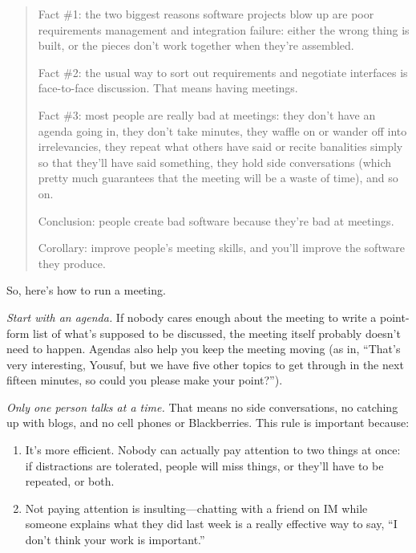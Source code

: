 \documentclass{report}
\begin{document}
\begin{quotation}

  Fact \#1: the two biggest reasons software projects blow up are poor
  requirements management and integration failure: either the wrong
  thing is built, or the pieces don't work together when they're
  assembled.

  Fact \#2: the usual way to sort out requirements and negotiate
  interfaces is face-to-face discussion.  That means having meetings.

  Fact \#3: most people are really bad at meetings: they don't have an
  agenda going in, they don't take minutes, they waffle on or wander
  off into irrelevancies, they repeat what others have said or recite
  banalities simply so that they'll have said something, they hold
  side conversations (which pretty much guarantees that the meeting
  will be a waste of time), and so on.

  Conclusion: people create bad software because they're bad at
  meetings.

  Corollary: improve people's meeting skills, and you'll improve the
  software they produce.

\end{quotation}

So, here's how to run a meeting.
  
\emph{Start with an agenda.} If nobody cares enough about the meeting
to write a point-form list of what's supposed to be discussed, the
meeting itself probably doesn't need to happen.  Agendas also help you
keep the meeting moving (as in, ``That's very interesting, Yousuf, but
we have five other topics to get through in the next fifteen minutes,
so could you please make your point?'').

\emph{Only one person talks at a time.}  That means no side
conversations, no catching up with blogs, and no cell phones or
Blackberries.  This rule is important because:

\begin{enumerate}

  \item It's more efficient.  Nobody can actually pay attention to two
  things at once: if distractions are tolerated, people will miss
  things, or they'll have to be repeated, or both.

  \item Not paying attention is insulting---chatting with a friend on
  IM while someone explains what they did last week is a really
  effective way to say, ``I don't think your work is important.''

\end{enumerate}
\end{document}
